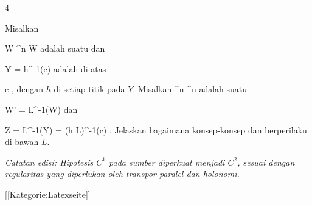 {4}
{

Misalkan

\mavergleichskette
{\vergleichskette
{ W
}
{ \subseteq }{ \R^n
}
{  }{
}
{    }{
}
{   }{
}
}
{}{}{}
 { W } { \R
} {}
adalah suatu
dan

\mavergleichskette
{\vergleichskette
{ Y
}
{ = }{ h^{-1}(c)
}
{  }{
}
{    }{
}
{   }{
}
}
{}{}{}
adalah
di atas

\mavergleichskette
{\vergleichskette
{ c
}
{ \in }{ \R
}
{  }{
}
{    }{
}
{   }{
}
}
{}{}{,}
dengan $h$
di setiap titik pada $Y$. Misalkan
 {\R^n } { \R^n
} {}
adalah suatu

\mavergleichskette
{\vergleichskette
{ W'
}
{ = }{ L^{-1}(W)
}
{  }{
}
{    }{
}
{   }{
}
}
{}{}{}
dan

\mavergleichskettedisp
{\vergleichskette
{ Z
}
{ =} { L^{-1}(Y)
}
{ =} { (h \circ L)^{-1}(c)
}
{ } {
}
{ } {
}
}
{}{}{.}
Jelaskan bagaimana konsep-konsep
dan
berperilaku di bawah $L$.

\emph{Catatan edisi: Hipotesis $C^1$ pada sumber diperkuat menjadi $C^2$, sesuai dengan regularitas yang diperlukan oleh transpor paralel dan holonomi.}

}
{} {}

 [[Kategorie:Latexseite]]
